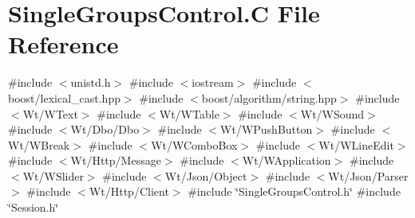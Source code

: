 \hypertarget{_single_groups_control_8_c}{}\section{Single\+Groups\+Control.\+C File Reference}
\label{_single_groups_control_8_c}
{\ttfamily \#include $<$unistd.\+h$>$}\newline
{\ttfamily \#include $<$iostream$>$}\newline
{\ttfamily \#include $<$boost/lexical\+\_\+cast.\+hpp$>$}\newline
{\ttfamily \#include $<$boost/algorithm/string.\+hpp$>$}\newline
{\ttfamily \#include $<$Wt/\+W\+Text$>$}\newline
{\ttfamily \#include $<$Wt/\+W\+Table$>$}\newline
{\ttfamily \#include $<$Wt/\+W\+Sound$>$}\newline
{\ttfamily \#include $<$Wt/\+Dbo/\+Dbo$>$}\newline
{\ttfamily \#include $<$Wt/\+W\+Push\+Button$>$}\newline
{\ttfamily \#include $<$Wt/\+W\+Break$>$}\newline
{\ttfamily \#include $<$Wt/\+W\+Combo\+Box$>$}\newline
{\ttfamily \#include $<$Wt/\+W\+Line\+Edit$>$}\newline
{\ttfamily \#include $<$Wt/\+Http/\+Message$>$}\newline
{\ttfamily \#include $<$Wt/\+W\+Application$>$}\newline
{\ttfamily \#include $<$Wt/\+W\+Slider$>$}\newline
{\ttfamily \#include $<$Wt/\+Json/\+Object$>$}\newline
{\ttfamily \#include $<$Wt/\+Json/\+Parser$>$}\newline
{\ttfamily \#include $<$Wt/\+Http/\+Client$>$}\newline
{\ttfamily \#include \char`\"{}Single\+Groups\+Control.\+h\char`\"{}}\newline
{\ttfamily \#include \char`\"{}Session.\+h\char`\"{}}\newline
